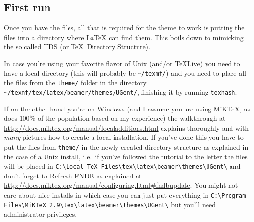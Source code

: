 \documentclass[a4paper,10pt]{article}
\theoremstyle{definition}
\begin{document}
\subsection{First run}
Once you have the files, all that is required for the theme to work is putting the files into a directory where \LaTeX{} can find them. This boils down to mimicking the so called TDS (or \TeX\ Directory Structure).

In case you're using your favorite flavor of Unix (and/or \TeX Live) you need to have a local directory (this will probably be \verb|~/texmf/|) and you need to place all the files from the \verb|theme/| folder in the directory \verb|~/texmf/tex/latex/beamer/themes/UGent/|, finishing it by running \verb|texhash|.

If on the other hand you're on Windows (and I assume you are using MiK\TeX, as does 100\% of the population based on my experience) the walkthrough at \url{http://docs.miktex.org/manual/localadditions.html} explains thoroughly and with \emph{many} pictures how to create a local installation. If you've done this you have to put the files from \verb|theme/| in the newly created directory structure as explained in the case of a Unix install, i.e.\ if you've followed the tutorial to the letter the files will be placed in \verb|C:\Local TeX Files\tex\latex\beamer\themes\UGent\| and don't forget to Refresh FNDB as explained at \url{http://docs.miktex.org/manual/configuring.html#fndbupdate}. You might not care about nice installs in which case you can just put everything in \verb|C:\Program Files\MiKTeX 2.9\tex\latex\beamer\themes\UGent\| but you'll need administrator privileges.
\end{document}

